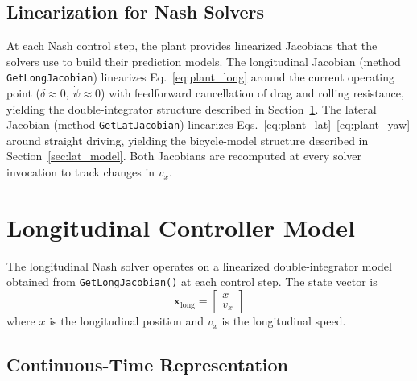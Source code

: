 \documentclass[12pt,a4paper,oneside]{report}
\begin{document}
\subsection{Linearization for Nash Solvers}

At each Nash control step, the plant provides linearized Jacobians that the solvers
use to build their prediction models. The longitudinal Jacobian (method
\texttt{GetLongJacobian}) linearizes Eq.~\eqref{eq:plant_long} around the current
operating point ($\delta \approx 0$, $\dot\psi \approx 0$) with feedforward
cancellation of drag and rolling resistance, yielding the double-integrator structure
described in Section~\ref{sec:long_model}. The lateral Jacobian (method
\texttt{GetLatJacobian}) linearizes Eqs.~\eqref{eq:plant_lat}--\eqref{eq:plant_yaw}
around straight driving, yielding the bicycle-model structure described in
Section~\ref{sec:lat_model}. Both Jacobians are recomputed at every solver invocation
to track changes in $v_x$.

\section{Longitudinal Controller Model}
\label{sec:long_model}

The longitudinal Nash solver operates on a linearized double-integrator model
obtained from \texttt{GetLongJacobian()} at each control step. The state vector is
\begin{equation}
\mathbf{x}_{\text{long}} = \begin{bmatrix} x \\ v_x \end{bmatrix}
\label{eq:long_state}
\end{equation}
where $x$ is the longitudinal position and $v_x$ is the longitudinal speed.

\subsection{Continuous-Time Representation}
\end{document}
